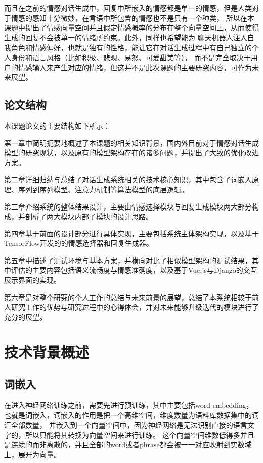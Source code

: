 \documentclass[supercite]{HustGraduPaper}
\theoremstyle{definition}
\begin{document}
而且在之前的情感对话生成中，回复中所嵌入的情感都是单一的情感，但是人类对于情感的感知十分微妙，在言语中所包含的情感也不是只有一个种类，
所以在本课题中提出了情感向量空间\cite{bao2019cyclegan}并且假定情感概率的分布在整个向量空间上，从而使得生成的回复不会被单一的情绪所约束。此外，同样也希望能为
聊天机器人注入自我角色和情感偏好，也就是独有的性格，能让它在对话生成过程中有自己独立的个人身份和语言风格\cite{li2016persona}（比如积极、悲观、易怒、可爱甜美等），
而不是完全取决于用户的情感输入来产生对应的情绪，但这并不是此次课题的主要研究内容，可作为未来展望。




\subsection{论文结构}
本课题论文的主要结构如下所示：

第一章中简明扼要地概述了本课题的相关知识背景，国内外目前对于情感对话生成模型的研究现状，以及原有的模型架构存在的诸多问题，并提出了大致的优化改进方案。

第二章详细归纳与总结了对话生成系统相关的技术核心知识，其中包含了词嵌入原理、序列到序列模型、注意力机制等算法模型的底层逻辑。

第三章介绍系统的整体结果设计，主要由情感选择模块与回复生成模块两大部分构成，并剖析了两大模块内部子模块的设计思路。

第四章基于前面的设计部分进行具体实现，主要包括系统主体架构实现，以及基于TensorFlow开发的的情感选择器和回复生成器。

第五章中描述了测试环境与基本方案，并横向对比了相似模型架构的测试结果，其中评估的主要内容包括语义流畅度与情感准确度，以及基于Vue.js与Django的交互展示界面的实现。

第六章是对整个研究的个人工作的总结与未来前景的展望，总结了本系统相较于前人研究工作的优势与研究过程中的心得体会，并对未来能够升级迭代的模块进行了充分的展望。


\section{技术背景概述} 
\subsection{词嵌入}
在进入神经网络训练之前，需要先进行预训练，其中主要包括word embedding，也就是词嵌入，词嵌入的作用是把一个高维空间，维度数量为语料库数据集中的词汇全部数量，
并嵌入到一个向量空间中，因为神经网络是无法识别直接的语言文字的，所以只能将其转换为向量空间来进行训练。
这个向量空间维数低得多并且是连续的而非离散的，并且全部的word或者phrase都会被一一对应映射到实数域上，展开为向量。
\end{document}
